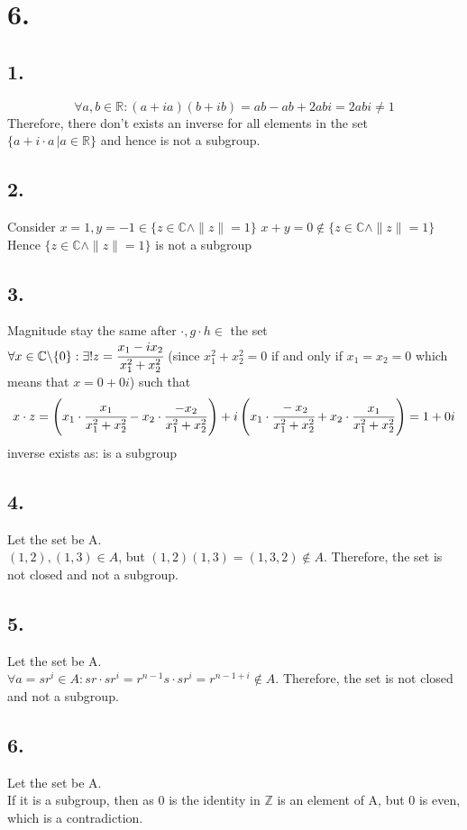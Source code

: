 \documentclass[11pt]{article}
\begin{document}
\pagebreak
\section*{6.}
\subsection*{1.}
\[
\forall a,b \in \mathbb{R} : (a + ia)(b + ib) = ab -ab + 2abi = 2abi \ne 1
\]
Therefore, there don't exists an inverse for all elements in the set \\$\{a + i\cdot a \, | a \in \mathbb{R}\}$ and hence is not a subgroup.
\subsection*{2.}
Consider $x = 1 , y = -1 \in \{z \in \mathbb{C} \land \|z\| = 1\}$
$x+y = 0 \notin \{z \in \mathbb{C} \land \|z\| = 1\}$ 
Hence $\{z \in \mathbb{C} \land \|z\| = 1\}$  is not a subgroup
\subsection*{3.}
Magnitude stay the same after $\cdot, g \cdot h \in$ the set\\
$\forall x \in \mathbb{C} \backslash \{0\}: \exists !z= \cfrac{x_1 - ix_2}{x_1^2+x_2^2}$ (since $x_1^2+x_2^2=0$ if and only if $x_1 = x_2 = 0$ which means that $x = 0+0i$) such that 
\[
x \cdot z = \left(x_1 \cdot \cfrac{x_1}{x_1^2 + x_2^2} - x_2 \cdot \frac{-x_2}{x_1^2 + x_2^2} \right) + i\left( x_1 \cdot \cfrac{-x_2}{x_1^2 + x_2^2} + x_2 \cdot \frac{x_1}{x_1^2 + x_2^2}\right) = 1+0i
\]
inverse exists as:
is a subgroup
\subsection*{4.}
Let the set be A. \\
$(1,2), (1,3) \in A$, but $(1,2)(1,3) = (1,3,2) \notin A$. 
Therefore, the set is not closed and not a subgroup.
\subsection*{5.}
Let the set be A. \\
$\forall a = sr^i \in A: sr \cdot sr^i = r^{n-1} s \cdot s r^i = r^{n-1+i} \notin A$.
Therefore, the set is not closed and not a subgroup.
\subsection*{6.}
Let the set be A. \\
If it is a subgroup, then as 0 is the identity in $\mathbb{Z}$ is an element of A, but 0 is even, which is a contradiction.
\end{document}
